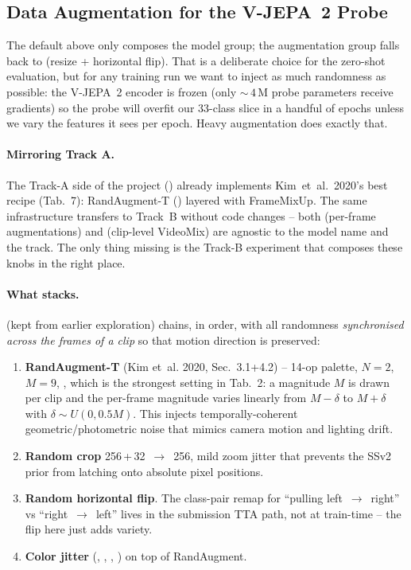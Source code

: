 \subsection{Data Augmentation for the V-JEPA~2 Probe}
\label{sec:trackb:heavy_aug}

The default  above only composes the model
group; the augmentation group falls back to 
(resize + horizontal flip). That is a deliberate choice for the
zero-shot evaluation, but for any training run we want to inject as
much randomness as possible: the V-JEPA~2 encoder is frozen (only
\(\sim\,4\,\)M probe parameters receive gradients) so the probe will
overfit our 33-class slice in a handful of epochs unless we vary the
features it sees per epoch. Heavy augmentation does exactly that.

\paragraph{Mirroring Track A.}
The Track-A side of the project ()
already implements Kim~et~al.~2020's best recipe (Tab.~7): RandAugment-T
() layered with FrameMixUp. The same
infrastructure transfers to Track~B without code changes -- both
 (per-frame augmentations) and
 (clip-level VideoMix) are agnostic to
the model name and the track. The only thing missing is the Track-B
experiment that composes these knobs in the right place.

\paragraph{What  stacks.}
 (kept from earlier
exploration) chains, in order, with all randomness \emph{synchronised
across the frames of a clip} so that motion direction is preserved:
\begin{enumerate}[leftmargin=2em]
\item \textbf{RandAugment-T} (Kim et~al. 2020, Sec.~3.1+4.2) -- 14-op
   palette, \(N{=}2\), \(M{=}9\), ,
    which is the strongest setting in
   Tab.~2: a magnitude \(M\) is drawn per clip and the per-frame
   magnitude varies linearly from \(M-\delta\) to \(M+\delta\) with
   \(\delta\sim U(0, 0.5M)\). This injects temporally-coherent
   geometric/photometric noise that mimics camera motion and lighting
   drift.
\item \textbf{Random crop} 256\,+\,32~\(\to\)~256, mild zoom jitter
   that prevents the SSv2 prior from latching onto absolute pixel
   positions.
\item \textbf{Random horizontal flip}. The class-pair remap for
   ``pulling left~\(\to\)~right'' vs ``right~\(\to\)~left'' lives in
   the submission TTA path, not at train-time -- the flip here just
   adds variety.
\item \textbf{Color jitter} (, ,
   , ) on top of RandAugment.
\end{enumerate}

